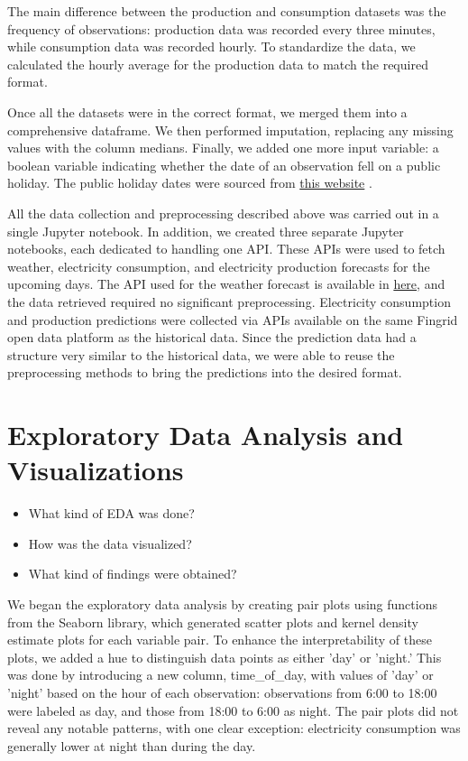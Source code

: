 \documentclass{article}
\numberwithin{equation}{section}
\begin{document}
\begin{itemize}
The main difference between the production and consumption datasets was the frequency of observations: production data was recorded every three minutes, while consumption data was recorded hourly. To standardize the data, we calculated the hourly average for the production data to match the required format.

Once all the datasets were in the correct format, we merged them into a comprehensive dataframe. We then performed imputation, replacing any missing values with the column medians. Finally, we added one more input variable: a boolean variable indicating whether the date of an observation fell on a public holiday. The public holiday dates were sourced from \href{https://www.officeholidays.com/countries/finland/2021}{this website} .

All the data collection and preprocessing described above was carried out in a single Jupyter notebook. In addition, we created three separate Jupyter notebooks, each dedicated to handling one API. These APIs were used to fetch weather, electricity consumption, and electricity production forecasts for the upcoming days. The API used for the weather forecast is available in \href{https://api.open-meteo.com/v1/forecast}{here}, and the data retrieved required no significant preprocessing. Electricity consumption and production predictions were collected via APIs available on the same Fingrid open data platform as the historical data. Since the prediction data had a structure very similar to the historical data, we were able to reuse the preprocessing methods to bring the predictions into the desired format.
\end{itemize}

\section{Exploratory Data Analysis and Visualizations}
\begin{itemize}
	\item What kind of EDA was done?
	\item How was the data visualized?
	\item What kind of findings were obtained?
\end{itemize}
We began the exploratory data analysis by creating pair plots using functions from the Seaborn library, which generated scatter plots and kernel density estimate plots for each variable pair. To enhance the interpretability of these plots, we added a hue to distinguish data points as either 'day' or 'night.' This was done by introducing a new column, time_of_day, with values of 'day' or 'night' based on the hour of each observation: observations from 6:00 to 18:00 were labeled as day, and those from 18:00 to 6:00 as night. The pair plots did not reveal any notable patterns, with one clear exception: electricity consumption was generally lower at night than during the day.
\end{document}
